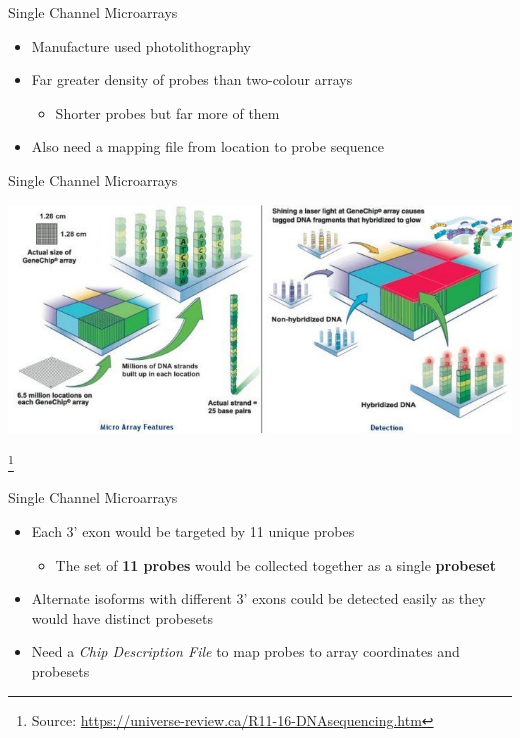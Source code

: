 \documentclass[aspectratio=169,11pt]{beamer}
\newcommand\blfootnote[1]{%
  \begingroup
  \renewcommand\thefootnote{}\footnote{#1}%
  \addtocounter{footnote}{-1}%
  \endgroup
}
\begin{document}
\begin{frame}{Single Channel Microarrays}

	\begin{itemize}
		\item Manufacture used photolithography
		\item Far greater density of probes than two-colour arrays
		\begin{itemize}
			\item Shorter probes but far more of them
		\end{itemize}
		\item Also need a mapping file from location to probe sequence
	\end{itemize}

\end{frame}

\begin{frame}{Single Channel Microarrays}

	\begin{center}
	\includegraphics[scale=0.4]{figures/microarrayLayout.jpg} 
	\end{center}
	
	\blfootnote{Source: \url{https://universe-review.ca/R11-16-DNAsequencing.htm}}

\end{frame}

\begin{frame}{Single Channel Microarrays}

	\begin{itemize}
		\item Each 3' exon would be targeted by 11 unique probes
		\begin{itemize}
			\item The set of \textbf{11 probes} would be collected together as a single \textbf{probeset}
		\end{itemize}
		\item Alternate isoforms with different 3' exons could be detected easily as they would have distinct probesets
		\item Need a \textit{Chip Description File} to map probes to array coordinates and probesets
	\end{itemize}


\end{frame}
\end{document}
